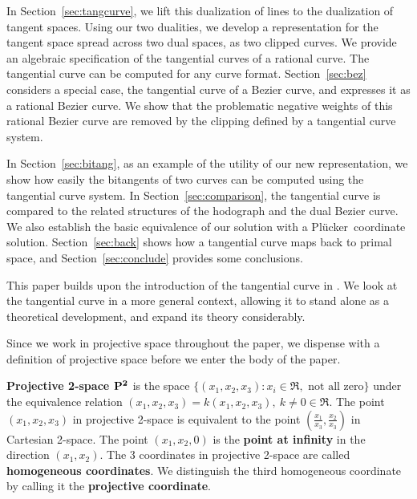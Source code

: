\documentclass[12pt]{article}
\newcommand{\plucker}{Pl\"{u}cker\ }
\begin{document}
In Section~\ref{sec:tangcurve}, we lift this dualization of lines to the dualization of tangent spaces.
Using our two dualities, we develop a representation
for the tangent space spread across two dual spaces, as two clipped curves.
We provide an algebraic specification of the tangential curves of a rational curve.
The tangential curve can be computed for any curve format.
Section~\ref{sec:bez} considers a special case, the tangential curve of a Bezier curve,
and expresses it as a rational Bezier curve.
We show that the problematic negative weights of this rational Bezier curve
are removed by the clipping defined by a tangential curve system.

In Section~\ref{sec:bitang},
as an example of the utility of our new representation, 
we show how easily the bitangents of two curves can be computed
using the tangential curve system.
In Section~\ref{sec:comparison}, the tangential curve is compared to 
the related structures of the hodograph and the dual Bezier curve.
We also establish the basic equivalence
of our solution with a \plucker coordinate solution.
Section~\ref{sec:back} shows how a tangential curve maps back to primal space,
and Section~\ref{sec:conclude} provides some conclusions.

This paper builds upon the introduction of the tangential curve in \cite{jj01a}.
We look at the tangential curve in a more general context,
allowing it to stand alone as a theoretical development,
and expand its theory considerably.

Since we work in projective space throughout the paper,
we dispense with a definition of projective space
before we enter the body of the paper.

\begin{defn2}
\label{defn:proj}
{\bf Projective 2-space ${\bf P^2}$} is the space 
$\{(x_1,x_2,x_3) : x_i \in \Re, \mbox{ not all zero}\}$
under the equivalence relation $(x_1,x_2,x_3) = k(x_1,x_2,x_3),\ k \neq 0 \in \Re$.
The point $(x_1,x_2,x_3)$ in projective 2-space
is equivalent to the point $(\frac{x_1}{x_3},\frac{x_2}{x_3})$
in Cartesian 2-space.
The point $(x_1,x_2,0)$ is the {\bf point at infinity} in the direction $(x_1,x_2)$.
The 3 coordinates in projective 2-space are called {\bf homogeneous coordinates}.
We distinguish the third homogeneous coordinate by calling it the 
{\bf projective coordinate}.
\end{defn2}

\end{document}

